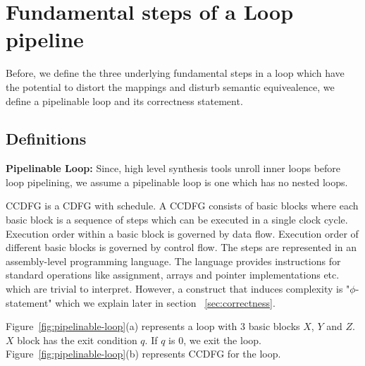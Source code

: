 \section{Fundamental steps of a Loop pipeline}
\label{sec:correctness-criterion}

Before, we define the three underlying fundamental steps in a loop which have the potential to distort the mappings and disturb semantic equivealence, we define a pipelinable loop and its correctness statement. 

\subsection{Definitions}
\label{sec:definitions}

\noindent
{\bf Pipelinable Loop:} Since, high level synthesis tools unroll inner loops before loop pipelining, we assume a pipelinable loop is one which has no nested loops. 
 
\smallskip
{} CCDFG is a CDFG with schedule. A CCDFG consists of basic blocks where each basic block is a sequence of steps which can be executed in a single clock cycle. Execution order within a basic block is governed by data flow. Execution order of different basic blocks is governed by control flow. The steps are represented in an assembly-level programming language. The language provides instructions for standard operations like assignment, arrays and pointer implementations etc. which are trivial to interpret. However, a construct that induces complexity is "$\phi$-statement" which we explain later in section ~\ref{sec:correctness}.

Figure~\ref{fig:pipelinable-loop}(a) represents a loop with 3 basic blocks $X$, $Y$ and $Z$. $X$ block has the exit condition $q$. If $q$ is 0, we exit the loop. Figure~\ref{fig:pipelinable-loop}(b) represents CCDFG for the loop.

